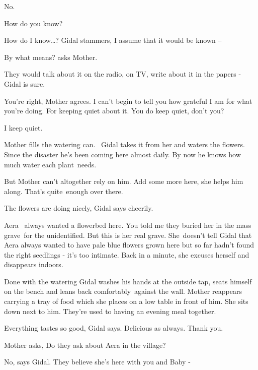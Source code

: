 \documentclass[letterpaper]{article}
\begin{document}
{\textquotedbl}No.{\textquotedbl} 

{\textquotedbl}How do you know?{\textquotedbl}

{\textquotedbl}How do I know{\dots}?{\textquotedbl} Gidal stammers, {\textquotedbl}I assume that it would be known
--{\textquotedbl} 

{\textquotedbl}By what means?{\textquotedbl} asks Mother.

{\textquotedbl}They would talk about it on the radio, on TV, write about it in the papers -{\textquotedbl} Gidal is
sure.

{\textquotedbl}You're right,{\textquotedbl} Mother agrees. {\textquotedbl}I can't begin to tell you how grateful I am
for what you're doing. For keeping quiet about it. You do keep quiet, don't you?{\textquotedbl} 

{\textquotedbl}I keep quiet.{\textquotedbl}

Mother fills the watering can. ~Gidal takes it from her and waters the flowers. Since the disaster he's been coming here
almost daily. By now he knows how much water each plant~needs. 

But Mother can't altogether rely on him. {\textquotedbl}Add some more here,{\textquotedbl} she helps him along.
{\textquotedbl}That's quite~enough over there.{\textquotedbl} 

{\textquotedbl}The flowers are doing nicely,{\textquotedbl} Gidal says cheerily.

{\textquotedbl}Aera~ always wanted a flowerbed here. You told me they buried her in the mass grave~for the unidentified.
But this is her real grave.{\textquotedbl} She~doesn't tell Gidal that Aera always wanted to have pale blue flowers
grown here but so far hadn't found the right seedlings - it's too intimate. {\textquotedbl}Back in a
minute,{\textquotedbl} she excuses herself and disappears indoors.

Done with the watering Gidal washes his hands at the outside tap, seats himself on the bench and leans back
comfortably~against the wall. Mother reappears carrying a tray of food which she places on a low table in front of him.
She sits down next to him. They're used to having an evening meal together.

{\textquotedbl}Everything tastes so good,{\textquotedbl} Gidal says. {\textquotedbl}Delicious as always. Thank
you.{\textquotedbl} 

Mother asks, {\textquotedbl}Do they ask about Aera in the village?{\textquotedbl} 

{\textquotedbl}No,{\textquotedbl} says Gidal. {\textquotedbl}They believe she's here with you and Baby -{\textquotedbl} 
\end{document}
